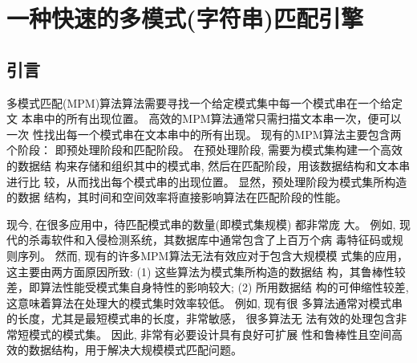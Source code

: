 





\chapter{一种快速的多模式(字符串)匹配引擎}
\label{chap:MPM}

\section{引言}
\label{sec:2_introduction}


多模式匹配(MPM)算法算法需要寻找一个给定模式集中每一个模式串在一个给定文
本串中的所有出现位置。 高效的MPM算法通常只需扫描文本串一次，便可以一次
性找出每一个模式串在文本串中的所有出现。 现有的MPM算法主要包含两个阶段：
即预处理阶段和匹配阶段。 在预处理阶段, 需要为模式集构建一个高效的数据结
构来存储和组织其中的模式串, 然后在匹配阶段，用该数据结构和文本串进行比
较，从而找出每个模式串的出现位置。 显然，预处理阶段为模式集所构造的数据
结构，其时间和空间效率将直接影响算法在匹配阶段的性能。

现今, 在很多应用中，待匹配模式串的数量(即模式集规模) 都非常庞
大。 例如, 现代的杀毒软件和入侵检测系统，其数据库中通常包含了上百万个病
毒特征码或规则序列。 然而, 现有的许多MPM算法无法有效应对于包含大规模模
式集的应用，这主要由两方面原因所致: (1) 这些算法为模式集所构造的数据结
构，其鲁棒性较差，即算法性能受模式集自身特性的影响较大; (2) 所用数据结
构的可伸缩性较差, 这意味着算法在处理大的模式集时效率较低。 例如, 现有很
多算法通常对模式串的长度，尤其是最短模式串的长度，非常敏感， 很多算法无
法有效的处理包含非常短模式的模式集。 因此, 非常有必要设计具有良好可扩展
性和鲁棒性且空间高效的数据结构，用于解决大规模模式匹配问题。

